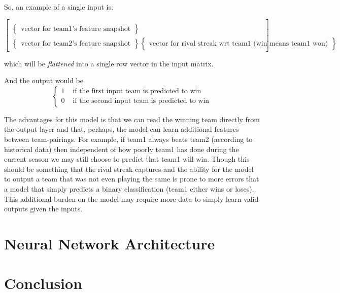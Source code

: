\documentclass{article} %
\begin{document}
So, an example of a single input is:

\[
\begin{bmatrix}
  \\
  \begin{Bmatrix}
    \text{vector for team1's feature snapshot}
  \end{Bmatrix}
  \\
  \begin{Bmatrix}
    \text{vector for team2's feature snapshot}
  \end{Bmatrix}
  \begin{Bmatrix}
    \text{vector for rival streak wrt team1 (win means team1 won)}
  \end{Bmatrix}
\end{bmatrix}
\]

which will be \textit{flattened} into a single row vector in the input matrix.

And the output would be
\[
\begin{cases}
  1 & \text{ if the first input team is predicted to win}
  \\
  0 & \text{ if the second input team is predicted to win}
\end{cases}
\]


The advantages for this model is that we can read the winning team directly from the output layer and that, perhaps, the model can learn additional features between team-pairings.  For example, if team1 always beats team2 (according to historical data) then independent of how poorly team1 has done during the current season we may still choose to predict that team1 will win.  Though this should be something that the rival streak captures and the ability for the model to output a team that was not even playing the same is prone to more errors that a model that simply predicts a binary classification (team1 either wins or loses).  This additional burden on the model may require more data to simply learn valid outputs given the inputs.




\section{Neural Network Architecture}
\label{sec:nn-architecture}


\section{Conclusion}
\label{sec:conclusion}


\small{
\nocite{*}


}
\end{document}
